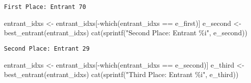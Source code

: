 \documentclass[
  letterpaper,
  DIV=11,
  numbers=noendperiod]{scrartcl}
\newenvironment{Shaded}{\begin{snugshade}}{\end{snugshade}}
\newcommand{\DecValTok}[1]{\textcolor[rgb]{0.68,0.00,0.00}{#1}}
\newcommand{\FunctionTok}[1]{\textcolor[rgb]{0.28,0.35,0.67}{#1}}
\newcommand{\NormalTok}[1]{\textcolor[rgb]{0.00,0.23,0.31}{#1}}
\newcommand{\OtherTok}[1]{\textcolor[rgb]{0.00,0.23,0.31}{#1}}
\newcommand{\SpecialCharTok}[1]{\textcolor[rgb]{0.37,0.37,0.37}{#1}}
\newcommand{\StringTok}[1]{\textcolor[rgb]{0.13,0.47,0.30}{#1}}
\begin{document}
\begin{Shaded}
\end{Shaded}

\begin{Shaded}
\end{Shaded}

\begin{verbatim}
First Place: Entrant 70
\end{verbatim}

\begin{Shaded}
\begin{Highlighting}[]
\NormalTok{entrant\_idxs }\OtherTok{\textless{}{-}}\NormalTok{ entrant\_idxs[}\SpecialCharTok{{-}}\FunctionTok{which}\NormalTok{(entrant\_idxs }\SpecialCharTok{==}\NormalTok{ e\_first)]}
\NormalTok{e\_second }\OtherTok{\textless{}{-}} \FunctionTok{best\_entrant}\NormalTok{(entrant\_idxs)}
\FunctionTok{cat}\NormalTok{(}\FunctionTok{sprintf}\NormalTok{(}\StringTok{"Second Place: Entrant \%i"}\NormalTok{, e\_second))}
\end{Highlighting}
\end{Shaded}

\begin{verbatim}
Second Place: Entrant 29
\end{verbatim}

\begin{Shaded}
\begin{Highlighting}[]
\NormalTok{entrant\_idxs }\OtherTok{\textless{}{-}}\NormalTok{ entrant\_idxs[}\SpecialCharTok{{-}}\FunctionTok{which}\NormalTok{(entrant\_idxs }\SpecialCharTok{==}\NormalTok{ e\_second)]}
\NormalTok{e\_third }\OtherTok{\textless{}{-}} \FunctionTok{best\_entrant}\NormalTok{(entrant\_idxs)}
\FunctionTok{cat}\NormalTok{(}\FunctionTok{sprintf}\NormalTok{(}\StringTok{"Third Place: Entrant \%i"}\NormalTok{, e\_third))}
\end{Highlighting}
\end{Shaded}
\end{document}
